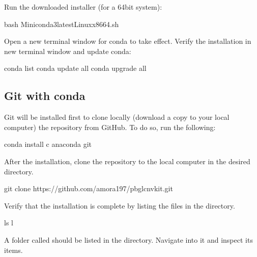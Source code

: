 \documentclass[letterpaper,10pt,english]{sphinxhowto}
\begin{document}
\sphinxAtStartPar
Run the downloaded installer (for a 64\sphinxhyphen{}bit system):

\begin{sphinxVerbatim}[commandchars=\\\{\}]
\PYGZdl{} bash Miniconda3\PYGZhy{}latest\PYGZhy{}Linux\PYGZhy{}x86\PYGZus{}64.sh
\end{sphinxVerbatim}

\sphinxAtStartPar
Open a new terminal window for conda to take effect. Verify the installation in new terminal window and update conda:

\begin{sphinxVerbatim}[commandchars=\\\{\}]
\PYGZdl{} conda list
\PYGZdl{} conda update \PYGZhy{}\PYGZhy{}all
\PYGZdl{} conda upgrade \PYGZhy{}\PYGZhy{}all
\end{sphinxVerbatim}


\subsection{Git with conda}
\label{\detokenize{index:git-with-conda}}
\sphinxAtStartPar
Git will be installed first to clone locally (download a copy to your local computer) the  repository from GitHub. To do so, run the following:

\begin{sphinxVerbatim}[commandchars=\\\{\}]
\PYGZdl{} conda install \PYGZhy{}c anaconda git
\end{sphinxVerbatim}

\sphinxAtStartPar
After the installation, clone the  repository to the local computer in the desired directory.

\begin{sphinxVerbatim}[commandchars=\\\{\}]
\PYGZdl{} git clone https://github.com/amora197/pbgl\PYGZhy{}cnvkit.git
\end{sphinxVerbatim}

\sphinxAtStartPar
Verify that the installation is complete by listing the files in the directory.

\begin{sphinxVerbatim}[commandchars=\\\{\}]
\PYGZdl{} ls \PYGZhy{}l
\end{sphinxVerbatim}

\sphinxAtStartPar
A folder called  should be listed in the directory. Navigate into it and inspect its items.
\end{document}
